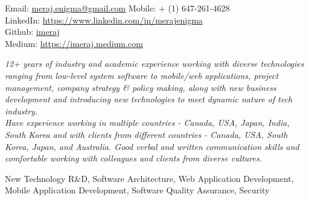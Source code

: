 \documentclass[10pt,a4paper]{article} %
\begin{document}


\noindent Email: \href{mailto:meraj.enigma@gmail.com}{meraj.enigma@gmail.com}\bull
\textsmaller Mobile: {+} (1) 647-261-4628 \\
LinkedIn: \href{https://www.linkedin.com/in/merajenigma}{https://www.linkedin.com/in/merajenigma}\\
Github: \href{https://github.com/imeraj}{imeraj} \\
Medium: \href{https://imeraj.medium.com} {https://imeraj.medium.com}


\spacedhrule{0.9em}{-0.4em} %



\vspace{-1.3em} %

\begin{multicols}{2}  %
\noindent \textit{12+ years of industry and academic experience working with diverse technologies ranging from low-level system software to mobile/web applications, project management, company strategy \& policy making, along with new business development and introducing new technologies to meet dynamic nature of tech industry.\\
Have experience working in multiple countries - Canada, USA, Japan, India, South Korea and with clients from different countries - Canada, USA, South Korea, Japan, and Australia. Good verbal and written communication skills and comfortable working with colleagues and clients from diverse cultures.}
\end{multicols}

 New Technology R\&D, Software Architecture, Web Application Development, Mobile Application Development, Software Quality Assurance, Security

\spacedhrule{0.5em}{-0.4em} %
\end{document}
